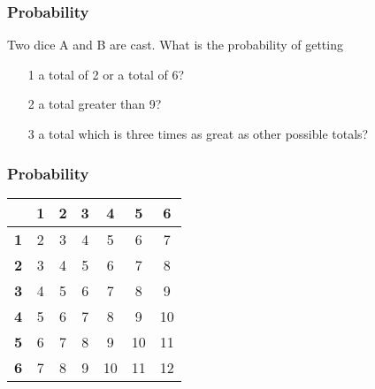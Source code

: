\documentclass[IntroMain.tex]{subfiles}
\begin{document}
	\begin{frame}
		\frametitle{Probability}
		\Large
		Two dice A and B are cast. What is the probability of getting
		\begin{itemize}
			\item[1] a total of 2 or a total of 6?
			\item[2] a total greater than 9?
			\item[3] a total which is three times as great as other possible totals?
		\end{itemize}
		
	\end{frame}
		
		\begin{frame}
			\frametitle{Probability}
			\large
			
			\begin{center}
				\begin{tabular}{|c||c|c|c|c|c|c|}
					\hline
					\phantom{space}	& \phantom{sp} \textbf{1}\phantom{sp}	&\phantom{sp} \textbf{2}\phantom{sp}&\phantom{sp} \textbf{3}\phantom{sp}	&\phantom{sp} \textbf{4}	\phantom{sp}&\phantom{sp} \textbf{5} \phantom{sp}&\phantom{sp}\textbf{6}	\phantom{sp}\\ \hline	\hline
					\textbf{1}	&	2	&	3	&	4	&	5	&	6	&	7	 \\ \hline	
					\textbf{2}	&	3	&	4	&	5	&	6	&	7	&	8	 \\ \hline	
					\textbf{3}	&	4	&	5	&	6	&	7	&	8	&	9	 \\ \hline	
					\textbf{4}	&	5	&	6	&	7	&	8	&	9	&	10	 \\ \hline	
					\textbf{5}	&	6	&	7	&	8	&	9	&	10	&	11	 \\ \hline	
					\textbf{6}	&	7	&	8	&	9	&	10	&	11	&	12	 \\ \hline	
				\end{tabular}
			\end{center}
			
		\end{frame}
	
\end{document}
